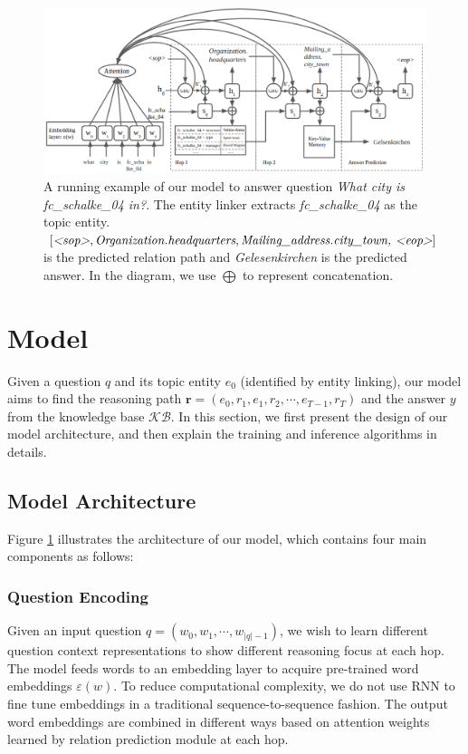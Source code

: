 \begin{figure}[t]
\includegraphics[width=2.1\columnwidth]{figs/model2.png}
\caption{\fontsize{10}{12}\selectfont A running example of our model to answer question \textit{What city is fc\_schalke\_04 in?}. The entity linker extracts \textit{fc\_schalke\_04} as the topic entity. $[\textit{\textless sop\textgreater}, \textit{Organization.headquarters} , \textit{Mailing\_address.city\_town, \textless eop\textgreater}]$ is the predicted relation path and \textit{Gelesenkirchen} is the predicted answer. In the diagram, we use $\bigoplus$ to represent concatenation. }
\label{fig:model}
\end{figure}


\section{Model}
 Given a question $q$ and its topic entity $e_0$ (identified by entity linking), our model aims to find the reasoning path $\mathbf{r} = (e_{0},r_{1},e_{1},r_{2}, \cdots,e_{T-1}, r_{T})$ and the answer $y$ from the knowledge base $\mathcal{KB}$. In this section, we first present the design of our model architecture, and then explain the training and inference algorithms in details.  

\subsection{Model Architecture}


Figure \ref{fig:model} illustrates the architecture of our model, which contains four main components as follows:

\subsubsection{Question Encoding} Given an input question $q=(w_0, w_1, \cdots, w_{|q|-1})$, we wish to learn different question context representations to show different reasoning focus at each hop. The model feeds words to an embedding layer to acquire pre-trained word embeddings $\varepsilon(w)$. 
To reduce computational complexity, we do not use RNN to fine tune embeddings in a traditional sequence-to-sequence fashion. The output word embeddings are combined in different ways based on attention weights learned by relation prediction module at each hop.


